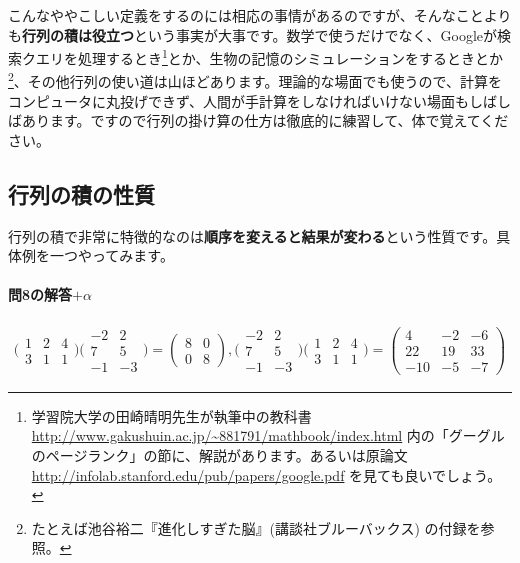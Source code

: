 こんなややこしい定義をするのには相応の事情があるのですが、そんなことよりも\textbf{行列の積は役立つ}という事実が大事です。数学で使うだけでなく、Googleが検索クエリを処理するとき\footnote{学習院大学の田崎晴明先生が執筆中の教科書 \url{http://www.gakushuin.ac.jp/~881791/mathbook/index.html} 内の「グーグルのページランク」の節に、解説があります。あるいは原論文 \url{http://infolab.stanford.edu/pub/papers/google.pdf} を見ても良いでしょう。}とか、生物の記憶のシミュレーションをするときとか\footnote{たとえば池谷裕二『進化しすぎた脳』(講談社ブルーバックス) の付録を参照。}、その他行列の使い道は山ほどあります。理論的な場面でも使うので、計算をコンピュータに丸投げできず、人間が手計算をしなければいけない場面もしばしばあります。ですので行列の掛け算の仕方は徹底的に練習して、体で覚えてください。

\subsection{行列の積の性質}
行列の積で非常に特徴的なのは\textbf{順序を変えると結果が変わる}という性質です。具体例を一つやってみます。

\paragraph{問8の解答$+\alpha$}
\begin{align*}
\biggl(
\begin{array}{ccc}
1 & 2 & 4 \\ \hline
3 & 1 & 1
\end{array}
\biggr)
\Biggl(
\begin{array}{c|c}
-2 & 2 \\
7 & 5 \\
-1 & -3
\end{array}
\Biggr)
=
\begin{pmatrix}
8 & 0 \\
0 & 8
\end{pmatrix}, 
\Biggl(
\begin{array}{cc}
-2 & 2 \\ \hline
7 & 5 \\ \hline
-1 & -3
\end{array}
\Biggr)
\biggl(
\begin{array}{c|c|c}
1 & 2 & 4 \\
3 & 1 & 1
\end{array}
\biggr)
=
\begin{pmatrix}
4 & -2 & -6 \\
22 & 19 & 33 \\
-10 & -5 & -7
\end{pmatrix}
\end{align*}

